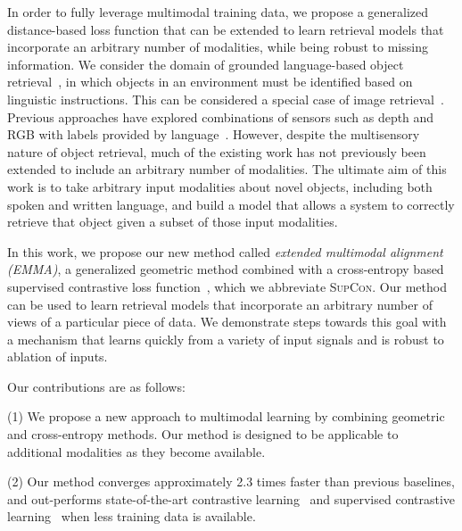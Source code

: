 \documentclass[sigconf,natbib=true,anonymous=true]{acmart}
\newcommand{\ours}{\textsc{EMMA}}
\newcommand{\supcon}{\textsc{SupCon}}
\begin{document}
In order to fully leverage multimodal training data, we propose a generalized distance-based loss function that can be extended to learn retrieval models that incorporate an arbitrary number of modalities, while being robust to missing information. We consider the domain of grounded language-based object retrieval~\citep{hu2016natural, triplet_loss_2021_CVPR}, in which objects in an environment must be identified based on linguistic instructions. This can be considered a special case of image retrieval~\citep{huang2017deep, ma2020large, novak2015large, vo2019composing}. Previous approaches have explored combinations of sensors such as depth and RGB with labels provided by language~\citep{RichardsDarvishMatuszekCategoryFree20}. However, despite the multisensory nature of object retrieval, much of the existing work has not previously been extended to include an arbitrary number of modalities. The ultimate aim of this work is to take arbitrary input modalities about novel objects, including both spoken and written language, and build a model that allows a system to correctly retrieve that object given a subset of those input modalities. 

In this work, we propose our new method called \textit{extended multimodal alignment (\ours{})}, a generalized geometric method combined with a cross-entropy based supervised contrastive loss function~\cite{NEURIPS2020_supervised_contrastive}, which we abbreviate \supcon{}. Our method can be used to learn retrieval models that incorporate an arbitrary number of views of a particular piece of data. We demonstrate steps towards this goal with a mechanism that learns quickly from a variety of input signals and is robust to ablation of inputs.

Our contributions are as follows:

(1) We propose a new approach to multimodal learning by combining geometric and cross-entropy methods. Our method is designed to be applicable to additional modalities as they become available.
    
(2) Our method converges approximately 2.3 times faster than previous baselines, and out-performs state-of-the-art contrastive learning~\citep{chen2020simple} and supervised contrastive learning~\citep{NEURIPS2020_supervised_contrastive} when less training data is available.
    
\end{document}
